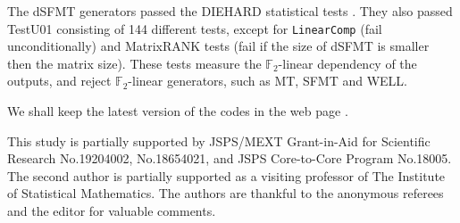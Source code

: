 \documentclass{svmult}
\begin{document}

The dSFMT generators passed the DIEHARD statistical tests \cite{diehard}.
They also passed TestU01 \cite{TESTU01} consisting of
144 different tests, except for
\texttt{LinearComp} (fail unconditionally) and
MatrixRANK tests (fail if the size of dSFMT is smaller then
the matrix size). These tests measure the ${\mathbb F}_2$-linear
dependency of the outputs, and reject ${\mathbb F}_2$-linear generators,
such as MT, SFMT and WELL.

We shall keep the latest version of the codes in the web page \cite{web:SFMT}.


\begin{acknowledgement}
This study is partially
supported by JSPS/MEXT Grant-in-Aid for Scientific Research
No.19204002, No.18654021, and JSPS Core-to-Core Program
No.18005. The second author is partially supported
as a visiting professor of The Institute of Statistical
Mathematics. The authors are thankful to the anonymous
referees and the editor for valuable comments.
\end{acknowledgement}
\end{document}
